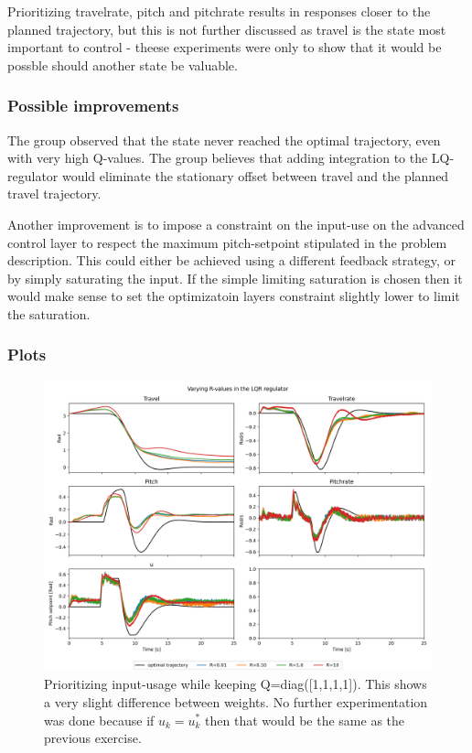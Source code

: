 \documentclass[../main.tex]{subfiles}
\begin{document}
Prioritizing travelrate, pitch and pitchrate results in responses closer to the planned trajectory, but this is not further discussed as travel is the state most important to control - theese experiments were only to show that it would be possble should another state be valuable.

\subsubsection{Possible improvements}
The group observed that the state never reached the optimal trajectory, even with very high Q-values. The group believes that adding integration to the LQ-regulator would eliminate the stationary offset between travel and the planned travel trajectory. 

Another improvement is to impose a constraint on the input-use on the advanced control layer to respect the maximum pitch-setpoint stipulated in the problem description. This could either be achieved using a different feedback strategy, or by simply saturating the input. If the simple limiting saturation is chosen then it would make sense to set the optimizatoin layers constraint slightly lower to limit the saturation.


\subsubsection{Plots}

\begin{figure}[h]
	\centering
    \includegraphics[width=0.8\linewidth]{figures/LAB3_R_variations.png}
	\caption{Prioritizing input-usage while keeping Q=diag([1,1,1,1]). This shows a very slight difference between weights. No further experimentation was done because if $u_k = u_k^*$ then that would be the same as the previous exercise.}
	\label{fig:LAB3_R_variations}
\end{figure}
\end{document}
